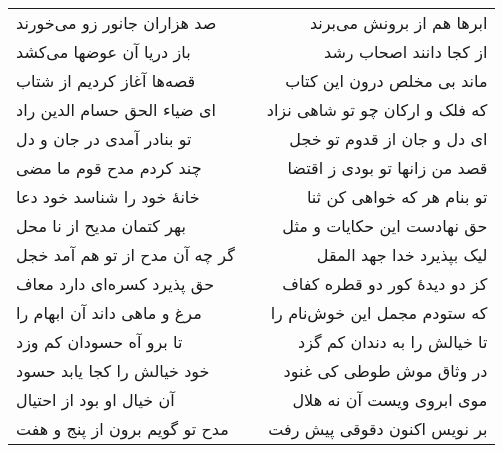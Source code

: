 \begin{center}
\begin{longtable}{l p{0.5cm} r}
\\
صد هزاران جانور زو می‌خورند
&&
ابرها هم از برونش می‌برند
\\
باز دریا آن عوضها می‌کشد
&&
از کجا دانند اصحاب رشد
\\
قصه‌ها آغاز کردیم از شتاب
&&
ماند بی مخلص درون این کتاب
\\
ای ضیاء الحق حسام الدین راد
&&
که فلک و ارکان چو تو شاهی نزاد
\\
تو بنادر آمدی در جان و دل
&&
ای دل و جان از قدوم تو خجل
\\
چند کردم مدح قوم ما مضی
&&
قصد من زانها تو بودی ز اقتضا
\\
خانهٔ خود را شناسد خود دعا
&&
تو بنام هر که خواهی کن ثنا
\\
بهر کتمان مدیح از نا محل
&&
حق نهادست این حکایات و مثل
\\
گر چه آن مدح از تو هم آمد خجل
&&
لیک بپذیرد خدا جهد المقل
\\
حق پذیرد کسره‌ای دارد معاف
&&
کز دو دیدهٔ کور دو قطره کفاف
\\
مرغ و ماهی داند آن ابهام را
&&
که ستودم مجمل این خوش‌نام را
\\
تا برو آه حسودان کم وزد
&&
تا خیالش را به دندان کم گزد
\\
خود خیالش را کجا یابد حسود
&&
در وثاق موش طوطی کی غنود
\\
آن خیال او بود از احتیال
&&
موی ابروی ویست آن نه هلال
\\
مدح تو گویم برون از پنج و هفت
&&
بر نویس اکنون دقوقی پیش رفت
\\
\end{longtable}
\end{center}
